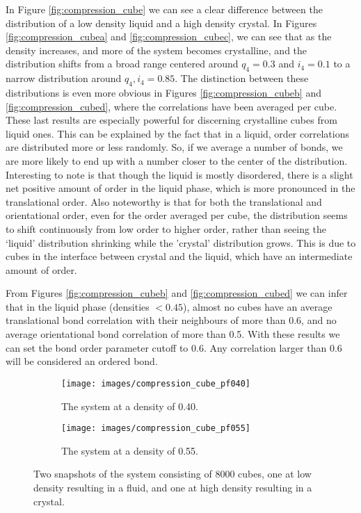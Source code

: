 \documentclass[thesis]{subfiles}
\begin{document}
In Figure \ref{fig:compression_cube} we can see a clear difference between the distribution of a low density liquid and a high density crystal. In Figures \ref{fig:compression_cubea} and \ref{fig:compression_cubec}, we can see that as the density increases, and more of the system becomes crystalline, and the distribution shifts from a broad range centered around $q_4 = 0.3$ and $i_4 = 0.1$ to a narrow distribution around $q_4, i_4 = 0.85.$ The distinction between these distributions is even more obvious in Figures \ref{fig:compression_cubeb} and \ref{fig:compression_cubed}, where the correlations have been averaged per cube. These last results are especially powerful for discerning crystalline cubes from liquid ones. This can be explained by the fact that in a liquid, order correlations are distributed more or less randomly. So, if we average a number of bonds, we are more likely to end up with a number closer to the center of the distribution.
Interesting to note is that though the liquid is mostly disordered, there is a slight net positive amount of order in the liquid phase, which is more pronounced in the translational order. Also noteworthy is that for both the translational and orientational order, even for the order averaged per cube, the distribution seems to shift continuously from low order to higher order, rather than seeing the `liquid' distribution shrinking while the 'crystal' distribution grows. This is due to cubes in the interface between crystal and the liquid, which have an intermediate amount of order.

From Figures \ref{fig:compression_cubeb} and \ref{fig:compression_cubed} we can infer that in the liquid phase (densities $< 0.45$), almost no cubes have an average translational bond correlation with their neighbours of more than 0.6, and no average orientational bond correlation of more than 0.5. With these results we can set the bond order parameter cutoff to 0.6. Any correlation larger than 0.6 will be considered an ordered bond.

\begin{figure}[h]
	{\centering
		\hfill
		\begin{subfigure}{0.42\textwidth}
			\centering
			\texttt{[image: images/compression\_cube\_pf040]}
			\caption{The system at a density of 0.40.}
		\end{subfigure}\hfill
		\begin{subfigure}{0.42\textwidth}
			\centering
			\texttt{[image: images/compression\_cube\_pf055]}
			\caption{The system at a density of 0.55.}
		\end{subfigure}
		\hfill}
	\caption{Two snapshots of the system consisting of 8000 cubes, one at low density resulting in a fluid, and one at high density resulting in a crystal.}
	\label{fig:compression_cube_snapshots}
\end{figure}
\end{document}
